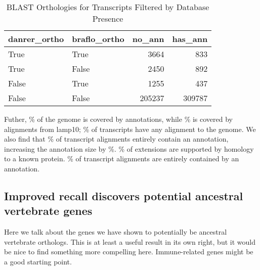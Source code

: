 \documentclass{article}
\begin{document}
\begin{table}[H]
\caption {BLAST Orthologies for Transcripts Filtered by Database Presence}
\begin{center}

\begin{tabular}{llrr}
\toprule
danrer\_ortho & braflo\_ortho &  no\_ann &  has\_ann \\
\midrule
        True &         True &    3664 &      833 \\
        True &        False &    2450 &      892 \\
       False &         True &    1255 &      437 \\
       False &        False &  205237 &   309787 \\
\bottomrule
\end{tabular}



\end{center}
\end{table}


Futher, \% of the genome is covered by annotations, while \% is covered by alignments from lamp10; 
\% of transcripts have any alignment to the genome. We also find that \% of transcript alignments 
entirely contain an annotation, increasing the annotation size by \%. \% of extensions are supported
by homology to a known protein. \% of transcript alignments are entirely contained by an annotation.



\subsection*{Improved recall discovers potential ancestral vertebrate genes}

Here we talk about the genes we have shown to potentially be ancestral vertebrate orthologs. This is
at least a useful result in its own right, but it would be nice to find something more compelling
here. Immune-related genes might be a good starting point. 


\end{document}
